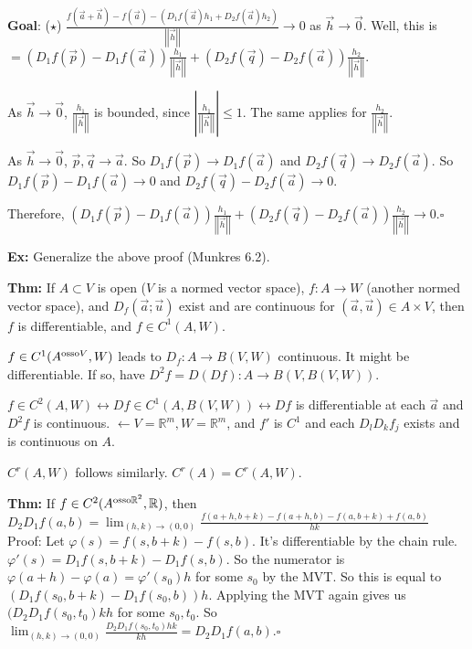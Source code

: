 \documentclass[10pt,letterpaper]{article}
\newcommand{\n}{\hfill\break}
\newcommand{\thm}[1]{\par\noindent\settowidth{\hangindent}{\textbf{Thm: }}\textbf{Thm: }#1\n}
\newcommand{\ex}[1]{\par\noindent\settowidth{\hangindent}{\textbf{Ex: }}\textbf{Ex: }#1\n}
\newcommand{\proven}{\;$\square$\n}
\newcommand{\ptxt}[1]{\textrm{\textnormal{#1}}}
\newcommand{\reals}{\mathbb{R}}
\newcommand{\R}{\reals}
\newcommand{\abs}[1]{\left|#1\right|}
\newcommand{\norm}[1]{\abs{\abs{#1}}}
\begin{document}
\par\noindent \textbf{Goal}: ($\star$) $\displaystyle\frac{f(\vec{a}+\vec{h})-f(\vec{a})-(D_{1}f(\vec{a})h_{1}+D_{2}f(\vec{a})h_{2})}{\norm{\vec{h}}}\to{}0$ as $\vec{h}\to\vec{0}$.\n
Well, this is $=(D_{1}f(\vec{p})-D_{1}f(\vec{a}))\frac{h_{1}}{\norm{\vec{h}}}+(D_{2}f(\vec{q})-D_{2}f(\vec{a}))\frac{h_{2}}{\norm{\vec{h}}}$.\n

\par\noindent As $\vec{h}\to\vec{0}$, $\frac{h_{1}}{\norm{\vec{h}}}$ is bounded, since $\abs{\frac{h_{1}}{\norm{\vec{h}}}}\le{}1$. The same applies for $\frac{h_{2}}{\norm{\vec{h}}}$.\n

\par\noindent As $\vec{h}\to\vec{0}$, $\vec{p},\vec{q}\to\vec{a}$. So $D_{1}f(\vec{p})\to{}D_{1}f(\vec{a})$ and $D_{2}f(\vec{q})\to{}D_{2}f(\vec{a})$. So $D_{1}f(\vec{p})-D_{1}f(\vec{a})\to{}0$ and $D_{2}f(\vec{q})-D_{2}f(\vec{a})\to{}0$.\n

\par\noindent Therefore, $(D_{1}f(\vec{p})-D_{1}f(\vec{a}))\frac{h_{1}}{\norm{\vec{h}}}+(D_{2}f(\vec{q})-D_{2}f(\vec{a}))\frac{h_{2}}{\norm{\vec{h}}}\to{}0$.\proven

\ex{Generalize the above proof (Munkres 6.2).\n}

\thm{If $A\subset{}V$ is open ($V$ is a normed vector space), $f:A\to{}W$ (another normed vector space), and $D_{f}(\vec{a};\vec{u})$ exist and are continuous for $(\vec{a},\vec{u})\in{}A\times{}V$, then $f$ is differentiable, and $f\in{}C^{1}(A,W)$.\n}

\par\noindent $f\in{}C^{1}(A^{\ptxt{osso}V},W)$ leads to $D_{f}:A\to{}B(V,W)$ continuous. It might be differentiable.\n
If so, have $D^{2}f=D(Df):A\to{}B(V,B(V,W))$.\n

\par\noindent $f\in{}C^{2}(A,W)\leftrightarrow{}Df\in{}C^{1}(A,B(V,W))\leftrightarrow{}Df$ is differentiable at each $\vec{a}$ and $D^{2}f$ is continuous.\n
$\leftarrow{}V=\R^{m},W=\R^{m}$, and $f'$ is $C^{1}$ and each $D_{l}D_{k}f_{j}$ exists and is continuous on $A$.\n

\par\noindent $C^{r}(A,W)$ follows similarly. $C^{r}(A)=C^{r}(A,W)$.\n

\thm{If $f\in{}C^{2}(A^{\ptxt{osso}\R^{2}},\R)$, then $\displaystyle{}D_{2}D_{1}f(a,b)=\lim_{(h,k)\to(0,0)}\frac{f(a+h,b+k)-f(a+h,b)-f(a,b+k)+f(a,b)}{hk}$\n
Proof: Let $\varphi(s)=f(s,b+k)-f(s,b)$. It's differentiable by the chain rule.\n
$\varphi'(s)=D_{1}f(s,b+k)-D_{1}f(s,b)$.\n
\n
So the numerator is $\varphi(a+h)-\varphi(a)=\varphi'(s_{0})h$ for some $s_{0}$ by the MVT.\n
So this is equal to $(D_{1}f(s_{0},b+k)-D_{1}f(s_{0},b))h$.\n
Applying the MVT again gives us $(D_{2}D_{1}f(s_{0},t_{0})kh$ for some $s_{0},t_{0}$.\n
\n
So $\displaystyle\lim_{(h,k)\to(0,0)}\frac{D_{2}D_{1}f(s_{0},t_{0})hk}{kh}=D_{2}D_{1}f(a,b)$.\proven}
\end{document}
